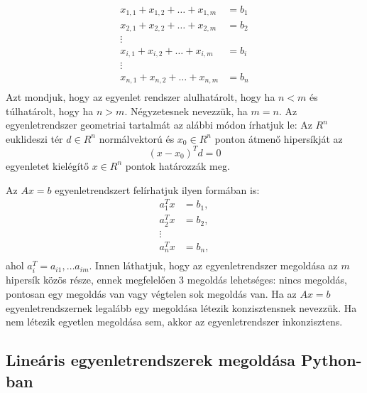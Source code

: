 \begin{align*}
x_{1,1} + x_{1,2} + \dots + x_{1,m} &= b_{1}\\
x_{2,1} + x_{2,2} + \dots + x_{2,m} &= b_{2}\\
\vdots\\
x_{i,1} + x_{i,2} + \dots + x_{i,m} &= b_{i}\\
\vdots\\
x_{n,1} + x_{n,2} + \dots + x_{n,m} &= b_{n}\\
\end{align*}
Azt mondjuk, hogy az egyenlet rendszer alulhatárolt, hogy ha \(n < m\) és
túlhatárolt, hogy ha \(n>m\). Négyzetesnek nevezzük, ha \(m = n\). Az
egyenletrendszer geometriai tartalmát az alábbi módon írhatjuk le:
    Az \(R^n\) euklideszi tér \(d\in R^n\) normálvektorú és \(x_0 \in R^n\)
ponton átmenő hipersíkját az
\[
(x - x_0)^Td=0
\]
egyenletet kielégítő \(x \in R^n\) pontok határozzák meg.

Az \(Ax=b\) egyenletrendszert felírhatjuk ilyen formában is:
\begin{align*} 
a_{1}^Tx &= b_1,\\
a_{2}^Tx &= b_2,\\
\vdots\\
a_{n}^Tx &= b_n,\\
\end{align*}
ahol \(a_{i}^T={a_{i1}, \dots a_{im}}\).
Innen láthatjuk, hogy az egyenletrendszer megoldása az \(m\) hipersík
közös része, ennek megfelelően 3 megoldás lehetséges: nincs megoldás, pontosan egy megoldás van vagy végtelen sok megoldás van.
Ha az \(Ax=b\) egyenletrendszernek legalább egy megoldása létezik
konzisztensnek nevezzük. Ha nem létezik egyetlen megoldása sem, akkor az
egyenletrendszer inkonzisztens.

\subsection{Lineáris egyenletrendszerek megoldása Python-ban}

